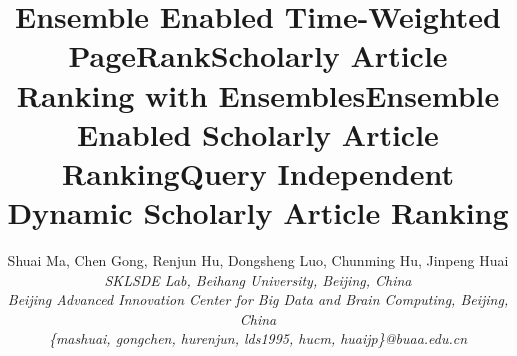 \documentclass[10pt,conference,letterpaper]{IEEEtran}
\newcommand{\eat}[1]{}
\begin{document}
\title{Ensemble Enabled Time-Weighted PageRank}


\title{Scholarly Article Ranking with Ensembles}



\title{Ensemble Enabled Scholarly Article Ranking}


\title{Query Independent Dynamic Scholarly Article Ranking}

\author{%
{Shuai Ma, Chen Gong, Renjun Hu, Dongsheng Luo, Chunming Hu, Jinpeng Huai}%
\vspace{1.6mm}\\
%
\fontsize{10}{10}\selectfont\itshape
SKLSDE Lab, Beihang University, Beijing, China\\
Beijing Advanced Innovation Center for Big Data and Brain Computing, Beijing, China\\
%
\fontsize{9}{9}\selectfont\ttfamily\upshape
\{mashuai, gongchen, hurenjun, lds1995, hucm, huaijp\}@buaa.edu.cn
}

\eat{
\author{\IEEEauthorblockN{Shuai Ma, Chen Gong, Renjun Hu, Dongsheng Luo, Chunming Hu, Jinpeng Huai\\
{\small SKLSDE Lab, Beihang University, Beijing, China}\\
{\small Beijing Advanced Innovation Center for Big Data and Brain Computing, Beijing, China}\\
{\small \{mashuai, gongchen, hurenjun, lds1995, hucm, huaijp\}@buaa.edu.cn}}
}
}%

\eat{
\author{
Shuai Ma, Chen Gong, Renjun Hu, Dongsheng Luo, Chunming Hu, Jinpeng Huai}
\affiliation{%
  \institution{SKLSDE Lab, Beihang University, China}
  \institution{Beijing Advanced Innovation Center for Big Data and Brain Computing, China}
  \institution{\{mashuai, gongchen, hurenjun, lds1995, hucm, huaijp\}@buaa.edu.cn}
  }
}%

\maketitle
\end{document}
